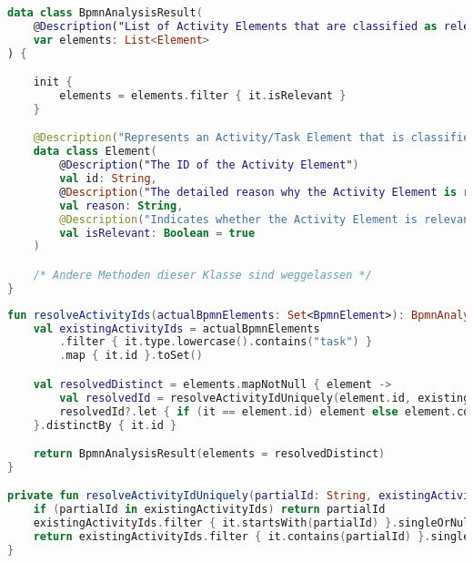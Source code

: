 \begin{lstlisting}[language=Kotlin,caption={Antworttyp der Klassifizierung},label={lst:bpmn-analysis-result}]
data class BpmnAnalysisResult(
    @Description("List of Activity Elements that are classified as relevant for GDPR compliance")
    var elements: List<Element>
) {

    init {
        elements = elements.filter { it.isRelevant }
    }

    @Description("Represents an Activity/Task Element that is classified as relevant for GDPR compliance")
    data class Element(
        @Description("The ID of the Activity Element")
        val id: String,
        @Description("The detailed reason why the Activity Element is relevant for GDPR compliance and why you think personal data is processed.")
        val reason: String,
        @Description("Indicates whether the Activity Element is relevant for GDPR compliance")
        val isRelevant: Boolean = true
    )

    /* Andere Methoden dieser Klasse sind weggelassen */
}
\end{lstlisting}

\begin{lstlisting}[language=Kotlin,caption={Kern der \texttt{id}-Validierung und -Vervollständigung},label={lst:activity-id-resolution}]
fun resolveActivityIds(actualBpmnElements: Set<BpmnElement>): BpmnAnalysisResult {
    val existingActivityIds = actualBpmnElements
        .filter { it.type.lowercase().contains("task") }
        .map { it.id }.toSet()

    val resolvedDistinct = elements.mapNotNull { element ->
        val resolvedId = resolveActivityIdUniquely(element.id, existingActivityIds)
        resolvedId?.let { if (it == element.id) element else element.copy(id = it) }
    }.distinctBy { it.id }

    return BpmnAnalysisResult(elements = resolvedDistinct)
}

private fun resolveActivityIdUniquely(partialId: String, existingActivityIds: Set<String>): String? {
    if (partialId in existingActivityIds) return partialId
    existingActivityIds.filter { it.startsWith(partialId) }.singleOrNull()?.let { return it }
    return existingActivityIds.filter { it.contains(partialId) }.singleOrNull()
}
\end{lstlisting}

